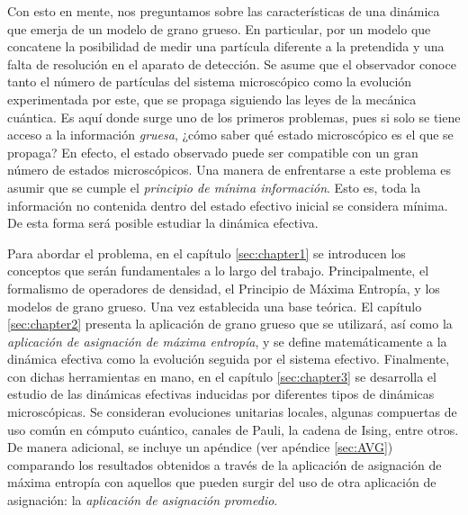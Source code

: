 

Con esto en mente, nos preguntamos sobre las características de una dinámica que emerja de un modelo de grano grueso. En particular, por un modelo que concatene la posibilidad de medir una partícula diferente a la pretendida y una falta de resolución en el aparato de detección. Se asume que el observador conoce tanto el número de partículas del sistema microscópico como la evolución experimentada por este, que se propaga siguiendo las leyes de la mecánica cuántica. Es aquí donde surge uno de los primeros problemas, pues si solo se tiene acceso a la información \textit{gruesa}, ¿cómo saber qué estado microscópico es el que se propaga? En efecto, el estado observado puede ser compatible con un gran número de estados microscópicos. Una manera de enfrentarse a este problema es asumir que se cumple el \textit{principio de mínima información}. Esto es, toda la información no contenida dentro del estado efectivo inicial se considera mínima. De esta forma será posible estudiar la dinámica efectiva. 



Para abordar el problema, en el capítulo \ref{sec:chapter1} se introducen los conceptos que serán fundamentales a lo largo del trabajo. Principalmente, el formalismo de operadores de densidad, el Principio de Máxima Entropía, y los modelos de grano grueso. Una vez establecida una base teórica. El capítulo \ref{sec:chapter2} presenta la aplicación de grano grueso que se utilizará, así como la \textit{aplicación de asignación de máxima entropía}, y se define matemáticamente a la dinámica efectiva como la evolución seguida por el sistema efectivo. Finalmente, con dichas herramientas en mano, en el capítulo \ref{sec:chapter3} se desarrolla el estudio de las dinámicas efectivas inducidas por diferentes tipos de dinámicas microscópicas. Se consideran evoluciones unitarias locales, algunas compuertas de uso común en cómputo cuántico, canales de Pauli, la cadena de Ising, entre otros. De manera adicional, se incluye un apéndice (ver apéndice \ref{sec:AVG}) comparando los resultados obtenidos a través de la aplicación de asignación de máxima entropía con aquellos que pueden surgir del uso de otra aplicación de asignación: la \textit{aplicación de asignación promedio}.